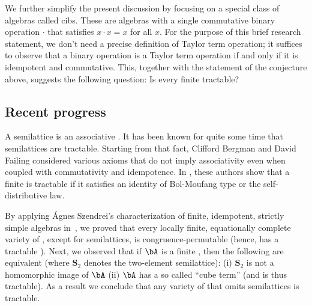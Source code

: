 We further simplify the present discussion by focusing on a special class of algebras
called \acp{cib}. %
These are algebras with a single commutative binary operation $\cdot$
that satisfies $x \cdot x = x$ for all $x$.
For the purpose of this brief research statement, we don't need a
precise definition of Taylor term operation; it
suffices to observe that a binary operation is a Taylor term operation
if and only if it is idempotent and commutative. This, together with 
the statement of the conjecture above, suggests the following question:
Is every finite \cib tractable?

\subsection{Recent progress}
A semilattice is an associative \cib. It has been known for quite some time that
semilattices are tractable. %
Starting from that fact, Clifford Bergman and David Failing considered various
axioms that do not imply associativity even when coupled with commutativity and
idempotence. In \cite{MR3350338}, these authors
show that a finite \cib is tractable if it satisfies an identity of 
Bol-Moufang type or the self-distributive law. 

By applying {\'A}gnes Szendrei's characterization of finite, idempotent,
strictly simple algebras in~\cite[Thm.~2.1]{MR911575}, %
we proved that every locally finite, equationally complete
variety of \cibs, except for semilattices, is congruence-permutable (hence, has
a tractable \csp).
Next, we observed that if $\bA$ is a finite
\cib, then the following are equivalent
(where $\mathbf S_2$ denotes the two-element semilattice):
(i) $\mathbf S_2$ is not a homomorphic image of $\bA$
(ii) $\bA$ has a so called ``cube term'' (and is thus tractable).
As a result we conclude that any variety of
\cibs that omits semilattices is tractable.  

